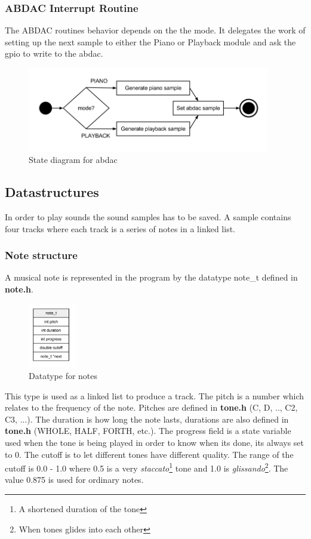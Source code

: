 \subsubsection{ABDAC Interrupt Routine}
The ABDAC routines behavior depends on the the mode. It delegates the work of setting up the next sample
to either the Piano or Playback module and ask the gpio to write to the abdac.

\begin{figure}[h]
  \centerline{\includegraphics[width=400px]{abdac_isr.png}}
  \caption{State diagram for abdac}
\end{figure}


\subsection{Datastructures}

In order to play sounds the sound samples has to be saved. A sample contains four tracks where each track
is a series of notes in a linked list.

\subsubsection{Note structure}
A musical note is represented in the program by the datatype note\_t defined in \textbf{note.h}.
\begin{figure}[h]
  \centerline{\includegraphics[width=80px]{note_t.png}}
  \caption{Datatype for notes}
\end{figure}

This type is used as a linked list to produce a track. The pitch is a number which relates to the frequency
of the note. Pitches are defined in \textbf{tone.h} (C, D, .., C2, C3, ...). The duration is how long the note lasts, durations
are also defined in \textbf{tone.h} (WHOLE, HALF, FORTH, etc.). The progress field is a state variable used
when the tone is being played in order to know when its done, its always set to 0. The cutoff is to let different tones have different
quality. The range of the cutoff is 0.0 - 1.0 where 0.5 is a very \textit{staccato}\footnote{A shortened duration of the tone}
tone and 1.0 is \textit{glissando}\footnote{When tones glides into each other}. The value 0.875 is used
for ordinary notes.

